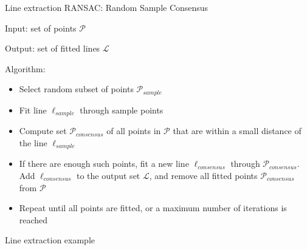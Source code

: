 \documentclass[xcolor=dvipsnames]{beamer}
\begin{document}
  \begin{frame}{Line extraction}
    RANSAC: Random Sample Consensus
    \vspace{0.5cm}

    Input: set of points $\mathcal{P}$

    Output: set of fitted lines $\mathcal{L}$

    Algorithm:
    \begin{itemize}
    \item Select random subset of points $\mathcal{P}_{sample}$
    \item Fit line $\ell_{sample}$ through sample points
    \item Compute set $\mathcal{P}_{consensus}$ of all points in $\mathcal{P}$
          that are within a small distance of the line $\ell_{sample}$
    \item If there are enough such points, fit a new line
          $\ell_{consensus}$ through $\mathcal{P}_{consensus}$.
          Add $\ell_{consensus}$ to the output set $\mathcal{L}$, and
          remove all fitted points $\mathcal{P}_{consensus}$ from $\mathcal{P}$
    \item Repeat until all points are fitted, or a maximum number of iterations
          is reached
    \end{itemize}
  \end{frame}

  {
  \begin{frame}{Line extraction example}
  \end{frame}
  }
\end{document}
